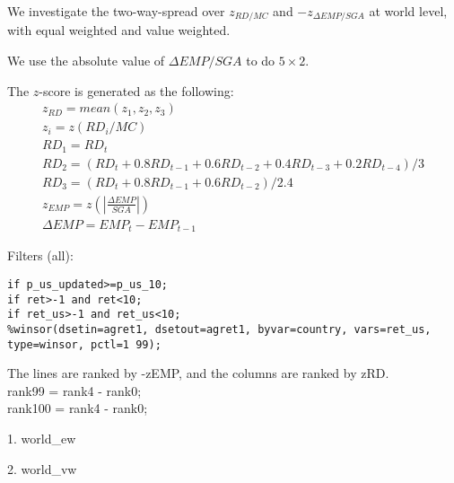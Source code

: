 

\usepackage[T1]{fontenc}




\thispagestyle{fancy}

\newcommand{\code}{\texttt}
\newcommand*{\Commonpath}{20190102/twoway/abs}


We investigate the two-way-spread over $z_{RD/MC}$ and $-z_{\Delta EMP/SGA}$ at world level, with equal weighted and value weighted. 

We use the absolute value of $\Delta EMP/SGA$ to do $5\times2$.

The $z$-score is generated as the following:
$$
\begin{aligned}
& z_{RD} = mean(z_1, z_2, z_3) \\
& z_i = z(RD_i/MC) \\
& RD_1 = RD_t \\
& RD_2 = (RD_t + 0.8RD_{t-1} + 0.6RD_{t-2} + 0.4RD_{t-3} + 0.2RD_{t-4})/3 \\
& RD_3 = (RD_t + 0.8RD_{t-1} + 0.6RD_{t-2})/2.4 
& \\
& z_{EMP} = z(|\frac{\Delta EMP}{SGA}|) \\
& \Delta EMP = EMP_t - EMP_{t-1}
\end{aligned}
$$


Filters (all):

\code{if p\_us\_updated>=p\_us\_10;} \\
\code{if ret>-1 and ret<10;} \\
\code{if ret\_us>-1 and ret\_us<10;} \\
\code{\%winsor(dsetin=agret1, dsetout=agret1, byvar=country, vars=ret\_us, type=winsor, pctl=1 99);}


The lines are ranked by -zEMP, and the columns are ranked by zRD. \\
rank99 = rank4 - rank0; \\
rank100 = rank4 - rank0;

\small

1. world\_ew


2. world\_vw




